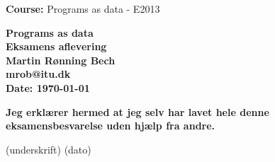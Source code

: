 \documentclass[a4paper,11pt]{article}
\begin{document}

\begin{titlepage}
\begin{flushleft}
\textbf{Course:} Programs as data - E2013
\end{flushleft}
\vspace{30mm}
\centering \parindent=0pt
\Huge\bfseries
Programs as data\\[0.7cm]
\large Eksamens aflevering\\
\vspace{20mm}
    Martin Rønning Bech 
\\  mrob@itu.dk\\
\vspace{50mm}
Date: \today

\vspace{25mm}
\begin{framed}
    \begin{minipage}{1\textwidth}
        \textbf{Jeg erklærer hermed at jeg selv har lavet hele denne
        eksamensbesvarelse uden hjælp fra andre.}
        \begin{flushright}
            (underskrift) (dato)
        \end{flushright}
    \end{minipage}
\end{framed}


\end{titlepage}


\end{document}
